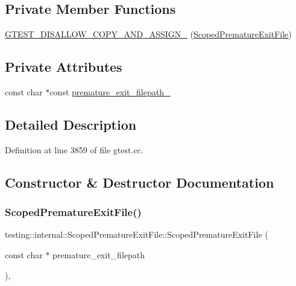 \subsection*{Private Member Functions}
\begin{DoxyCompactItemize}
\item 
\hyperlink{classtesting_1_1internal_1_1ScopedPrematureExitFile_a4c7a2d9d5a94035756b97b5c1e0c2597}{G\+T\+E\+S\+T\+\_\+\+D\+I\+S\+A\+L\+L\+O\+W\+\_\+\+C\+O\+P\+Y\+\_\+\+A\+N\+D\+\_\+\+A\+S\+S\+I\+G\+N\+\_\+} (\hyperlink{classtesting_1_1internal_1_1ScopedPrematureExitFile}{Scoped\+Premature\+Exit\+File})
\end{DoxyCompactItemize}
\subsection*{Private Attributes}
\begin{DoxyCompactItemize}
\item 
const char $\ast$const \hyperlink{classtesting_1_1internal_1_1ScopedPrematureExitFile_a41f573a197749afb0a2b14b289f7aa62}{premature\+\_\+exit\+\_\+filepath\+\_\+}
\end{DoxyCompactItemize}


\subsection{Detailed Description}


Definition at line 3859 of file gtest.\+cc.



\subsection{Constructor \& Destructor Documentation}
\mbox{\label{classtesting_1_1internal_1_1ScopedPrematureExitFile_ae520883b8a6984a864ce675acedff4a2}} 
\subsubsection{\texorpdfstring{Scoped\+Premature\+Exit\+File()}{ScopedPrematureExitFile()}}
{\footnotesize\ttfamily testing\+::internal\+::\+Scoped\+Premature\+Exit\+File\+::\+Scoped\+Premature\+Exit\+File (\begin{DoxyParamCaption}\item[{const char $\ast$}]{premature\+\_\+exit\+\_\+filepath }\end{DoxyParamCaption})\hspace{0.3cm}{\ttfamily [inline]}, {\ttfamily [explicit]}}




